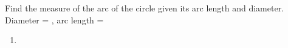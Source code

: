 Find the measure of the arc of the circle given its arc length and diameter.
\newline
Diameter = , arc length = 
\newline
\begin{enumerate}
    \item
    \degree
{}
\end{enumerate}
